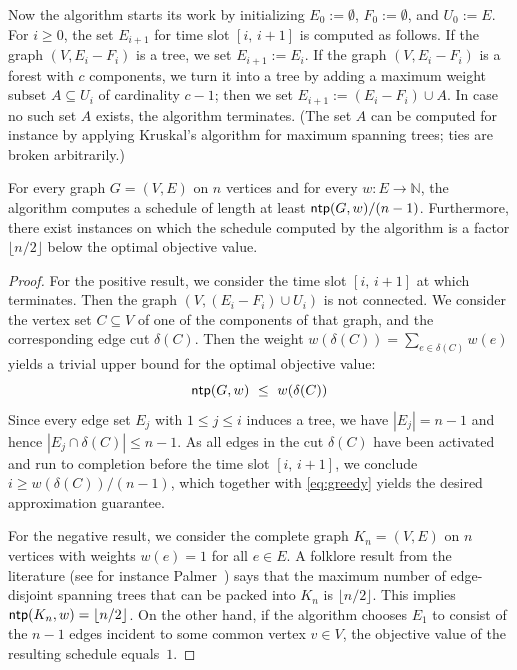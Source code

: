 \documentclass[runningheads]{llncs}
\newcommand{\N}{\mathbb{N}}
\DeclareMathOperator{\ntp}{\text{\sf ntp}}
\newcommand{\greedy}{\text{\sf Greedy}}
\begin{document}
Now the {\greedy} algorithm starts its work by initializing 
$E_0:=\emptyset$, $F_0:=\emptyset$, and $U_0:=E$.
For $i\ge0$, the set $E_{i+1}$ for time slot $[i,\,i+1]$ is computed as follows.
If the graph $(V,E_i-F_i)$ is a tree, we set $E_{i+1}:=E_i$.
If the graph $(V,E_i-F_i)$ is a forest with $c$ components, we turn it into 
a tree by adding a maximum weight subset $A\subseteq U_i$ of cardinality $c-1$;
then we set $E_{i+1}:=(E_i-F_i)\cup A$.
In case no such set $A$ exists, the {\greedy} algorithm terminates.
(The set $A$ can be computed for instance by applying Kruskal's algorithm for 
maximum spanning trees; ties are broken arbitrarily.)

\begin{theorem}
\label{th:greedy.approx}
For every graph $G=(V,E)$ on $n$ vertices and for every $w:E\to\N$, 
the {\greedy} algorithm computes a schedule of length at least $\ntp(G,w)/(n-1)$.
Furthermore, there exist instances on which the schedule computed by the 
{\greedy} algorithm is a factor $\lfloor n/2\rfloor$ below the optimal objective value.
\end{theorem}
\begin{proof}
For the positive result, we consider the time slot $[i,\,i+1]$ at which {\greedy} terminates.
Then the graph $(V,(E_i-F_i)\cup U_i)$ is not connected.
We consider the vertex set $C\subseteq V$ of one of the components of that graph, and the
corresponding edge cut $\delta(C)$.
Then the weight $w(\delta(C))=\sum_{e\in\delta(C)}w(e)$ yields a trivial upper bound for the 
optimal objective value: 
\begin{equation}
\label{eq:greedy}
\ntp(G,w) ~\le~ w(\delta(C))
\end{equation}
Since every edge set $E_j$ with $1\le j\le i$ induces a tree, we have $|E_j|=n-1$ and hence
$|E_j\cap \delta(C)|\le n-1$.
As all edges in the cut $\delta(C)$ have been activated and run to completion before the 
time slot $[i,\,i+1]$, we conclude $i\ge w(\delta(C))/(n-1)$, which together with \eqref{eq:greedy}
yields the desired approximation guarantee.

For the negative result, we consider the complete graph $K_n=(V,E)$ on $n$ vertices with 
weights $w(e)=1$ for all $e\in E$.
A folklore result from the literature (see for instance Palmer~\cite{Palmer2001}) says that the 
maximum number of edge-disjoint spanning trees that can be packed into $K_n$ is $\lfloor n/2\rfloor$.
This implies $\ntp(K_n,w)=\lfloor n/2\rfloor$.
On the other hand, if the {\greedy} algorithm chooses $E_1$ to consist of the $n-1$ edges incident
to some common vertex $v\in V$, the objective value of the resulting schedule equals~$1$.
\end{proof}
\end{document}
